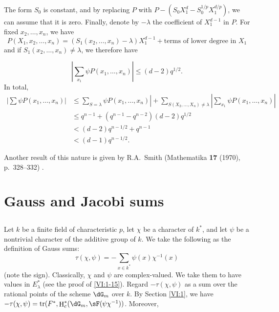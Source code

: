 \documentclass[oneside]{book}
\DeclareMathOperator{\h}{H}
\DeclareMathOperator{\tr}{tr}
\newcounter{char}
\theoremstyle{sga-source}
\theoremstyle{sga-source-dash}
\theoremstyle{sga-source-dotdash}
\theoremstyle{sga-source-number-note-dash}
\theoremstyle{sga-source-note-number-dotdash}
\theoremstyle{sga-source-example-dotdash}
\theoremstyle{sga-source-inline-number}
\theoremstyle{sga-source-bare-number}
\theoremstyle{sga-source}
\newcommand{\PrintPage}[1]{}\newcommand{\MathPage}[1]{}\newcommand{\PrintCite}[2]{#1}\newcommand{\var}[3]{#1}
\begin{document}
The form $S_0$ is constant, and by replacing $P$ with 
$P-(S_0 X_1^d -S_0^{1/p} X_1^{d/p})$, we can assume that it is zero. 
Finally, denote by $-\lambda$ the coefficient of $X_1^{d-1}$ in $P$. For fixed 
$x_2,\dots,x_n$, we have 
\[
  P(X_1,x_2,\dots,x_n) = (S_1(x_2,\dots,x_n)-\lambda) X_1^{d-1} + \text{terms of lower degree in $X_1$} 
\]
and if $S_1(x_2,\dots,x_n)\ne \lambda$, we therefore have 
\PrintPage{195}
\[
  \left| \sum_{x_1} \psi P(x_1,\dots,x_n)\right| \leqslant (d-2) q^{1/2} \text{.} 
\]
In total, 
\begin{align*}
  \left|\sum \psi P(x_1,\dots,x_n)\right| 
    &\leqslant \var{\left.}{\left|}{S45-SOL-0794}\var{\sum_{S=\lambda}}{\sum_{S_1=\lambda}}{S45-SOL-0795} \psi P(x_1,\dots,x_n)\right| + \var{\sum_{S(X_2,\dots,X_n)\ne\lambda}}{\sum_{S_1(X_2,\dots,X_n)\ne\lambda}}{S45-SOL-0796} \left| \sum_{x_1} \psi P(x_1,\dots,x_n)\right| \\
    &\leqslant q^{n-1} + (q^{n-1}-q^{n-2})(d-2) q^{1/2} \\
    &\var{< (d-2) q^{n-1/2} + q^{n-1}}{\leqslant (d-2) q^{n-1/2} + q^{n-1}}{S45-SOL-0797} \\
    &< (d-1) q^{n-1/2} \text{.}
\end{align*}

Another result of this nature is given by R.A.\ Smith 
(Mathematika \textbf{17} (1970), p.~328--332) \cite{sm70}. 










\PrintPage{196}
\section{Gauss and Jacobi sums}\label{VI:4}





\subsection{}\label{VI:4-1}

Let $k$ be a finite field of characteristic $p$, let $\chi$ be a character of 
$k^\ast$, and let $\psi$ be a nontrivial character of the additive group of $k$. 
We take the following as the definition of Gauss sums: 
\begin{equation*}\tag{4.1.1}\label{VI:eq:4-1-1}
  \tau(\chi,\psi) = -\sum_{x\in k^\ast} \psi(x) \chi^{-1}(x) 
\end{equation*}
(note the sign). Classically, $\chi$ and $\psi$ are complex-valued. 
We take them to have values in $E_\lambda^\ast$ (see the proof of 
\ref{VI:1-15}). Regard $-\tau(\chi,\psi)$ as a sum over the rational 
points of the scheme $\dG_m$ over $k$. By Section \ref{VI:1}, 
we have $-\tau(\chi,\psi) = \var{\tr(F^\ast,\h_c^\ast(\dG_m,\sF(\psi \chi^{-1}))}{\tr(F^\ast,\h_c^\ast(\dG_m,\sF(\psi \chi^{-1})))}{S45-SOL-0799}$. Moreover,
\end{document}
